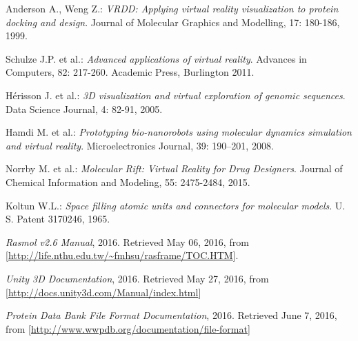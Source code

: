 \begin{thebibliography}{99}
 Anderson A., Weng Z.: \emph{VRDD: Applying virtual reality visualization to protein docking and design}. Journal of Molecular Graphics and Modelling, 17: 180-186, 1999.

 Schulze J.P. et al.: \emph{Advanced applications of virtual reality}. Advances in Computers, 82: 217-260. Academic Press, Burlington 2011.

 Hérisson J. et al.: \emph{3D visualization and virtual exploration of genomic sequences}. Data Science Journal, 4: 82-91, 2005.

 Hamdi M. et al.: \emph{Prototyping bio-nanorobots using molecular dynamics simulation and virtual reality}. Microelectronics Journal, 39: 190–201, 2008.

 Norrby M. et al.: \emph{Molecular Rift: Virtual Reality for Drug Designers}. Journal of Chemical Information and Modeling, 55: 2475-2484, 2015.

 Koltun W.L.: \emph{Space filling atomic units and connectors for molecular models}. U. S. Patent 3170246, 1965.

 \emph{Rasmol v2.6 Manual}, 2016. Retrieved May 06, 2016, from [\url{http://life.nthu.edu.tw/~fmhsu/rasframe/TOC.HTM}].

 \emph{Unity 3D Documentation}, 2016. Retrieved May 27, 2016, from [\url{http://docs.unity3d.com/Manual/index.html}]

 \emph{Protein Data Bank File Format Documentation}, 2016. Retrieved June 7, 2016, from [\url{http://www.wwpdb.org/documentation/file-format}]

\end{thebibliography}
